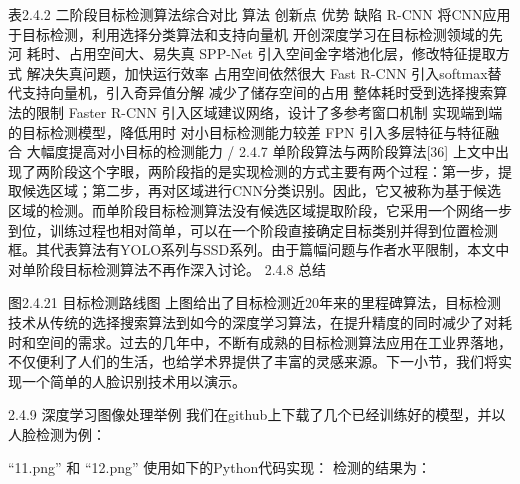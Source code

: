 表2.4.2 二阶段目标检测算法综合对比
算法	创新点	优势	缺陷
R-CNN	将CNN应用于目标检测，利用选择分类算法和支持向量机	开创深度学习在目标检测领域的先河	耗时、占用空间大、易失真
SPP-Net	引入空间金字塔池化层，修改特征提取方式	解决失真问题，加快运行效率	占用空间依然很大
Fast R-CNN	引入softmax替代支持向量机，引入奇异值分解	减少了储存空间的占用	整体耗时受到选择搜索算法的限制
Faster R-CNN	引入区域建议网络，设计了多参考窗口机制	实现端到端的目标检测模型，降低用时	对小目标检测能力较差
FPN	引入多层特征与特征融合	大幅度提高对小目标的检测能力	/
2.4.7 单阶段算法与两阶段算法[36]
上文中出现了两阶段这个字眼，两阶段指的是实现检测的方式主要有两个过程：第一步，提取候选区域；第二步，再对区域进行CNN分类识别。因此，它又被称为基于候选区域的检测。而单阶段目标检测算法没有候选区域提取阶段，它采用一个网络一步到位，训练过程也相对简单，可以在一个阶段直接确定目标类别并得到位置检测框。其代表算法有YOLO系列与SSD系列。由于篇幅问题与作者水平限制，本文中对单阶段目标检测算法不再作深入讨论。
2.4.8 总结

图2.4.21 目标检测路线图
上图给出了目标检测近20年来的里程碑算法，目标检测技术从传统的选择搜索算法到如今的深度学习算法，在提升精度的同时减少了对耗时和空间的需求。过去的几年中，不断有成熟的目标检测算法应用在工业界落地，不仅便利了人们的生活，也给学术界提供了丰富的灵感来源。下一小节，我们将实现一个简单的人脸识别技术用以演示。

2.4.9 深度学习图像处理举例
我们在github上下载了几个已经训练好的模型，并以人脸检测为例：
        
 “11.png” 和 “12.png”
使用如下的Python代码实现：
	检测的结果为：


